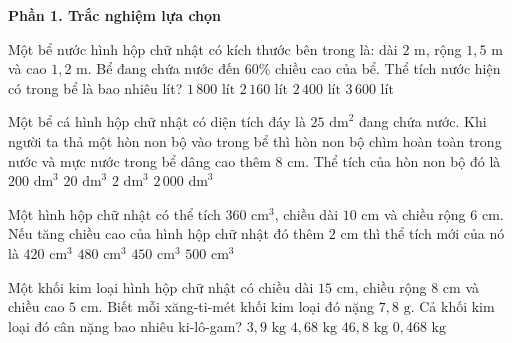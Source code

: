 \textbf{Phần 1. Trắc nghiệm lựa chọn}

\begin{ex} %
Một bể nước hình hộp chữ nhật có kích thước bên trong là: dài $2\text{ m}$, rộng $1{,}5\text{ m}$ và cao $1{,}2\text{ m}$. Bể đang chứa nước đến $60\%$ chiều cao của bể. Thể tích nước hiện có trong bể là bao nhiêu lít?
\choice
{$1\,800\text{ lít}$}
{\True $2\,160\text{ lít}$}
{$2\,400\text{ lít}$}
{$3\,600\text{ lít}$}
\end{ex}

\begin{ex} %
Một bể cá hình hộp chữ nhật có diện tích đáy là $25\text{ dm}^2$ đang chứa nước. Khi người ta thả một hòn non bộ vào trong bể thì hòn non bộ chìm hoàn toàn trong nước và mực nước trong bể dâng cao thêm $8\text{ cm}$. Thể tích của hòn non bộ đó là
\choice
{$200\text{ dm}^3$}
{\True $20\text{ dm}^3$}
{$2\text{ dm}^3$}
{$2\,000\text{ dm}^3$}
\end{ex}

\begin{ex} %
Một hình hộp chữ nhật có thể tích $360\text{ cm}^3$, chiều dài $10\text{ cm}$ và chiều rộng $6\text{ cm}$. Nếu tăng chiều cao của hình hộp chữ nhật đó thêm $2\text{ cm}$ thì thể tích mới của nó là
\choice
{$420\text{ cm}^3$}
{\True $480\text{ cm}^3$}
{$450\text{ cm}^3$}
{$500\text{ cm}^3$}
\end{ex}

\begin{ex} %
Một khối kim loại hình hộp chữ nhật có chiều dài $15\text{ cm}$, chiều rộng $8\text{ cm}$ và chiều cao $5\text{ cm}$. Biết mỗi xăng-ti-mét khối kim loại đó nặng $7{,}8\text{ g}$. Cả khối kim loại đó cân nặng bao nhiêu ki-lô-gam?
\choice
{$3{,}9\text{ kg}$}
{\True $4{,}68\text{ kg}$}
{$46{,}8\text{ kg}$}
{$0{,}468\text{ kg}$}
\end{ex}

